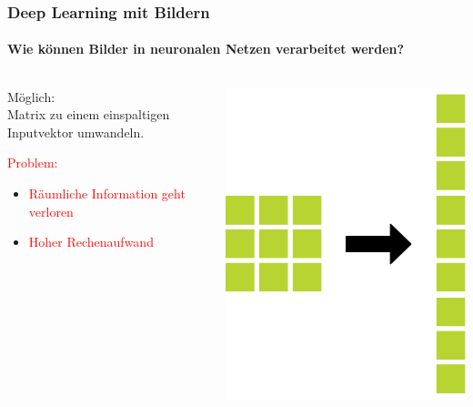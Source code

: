 \documentclass{beamer}
\begin{document}
\begin{frame}

\frametitle{Deep Learning mit Bildern}
\framesubtitle{Wie können Bilder in neuronalen Netzen verarbeitet werden?}

\begin{columns}[T]

\begin{column}[T]{5cm}
Möglich:\\
Matrix zu einem einspaltigen Inputvektor umwandeln.\newline

\textcolor{red}{Problem:}
\begin{itemize}
\item{\textcolor{red}{Räumliche Information geht verloren}}
\item{\textcolor{red}{Hoher Rechenaufwand}}
\end{itemize}

\end{column}

\begin{column}[T]{5cm}
	\includegraphics[scale=0.22]{figures/inputimage.png}	 
\end{column}

\end{columns}





\end{frame}
\end{document}

